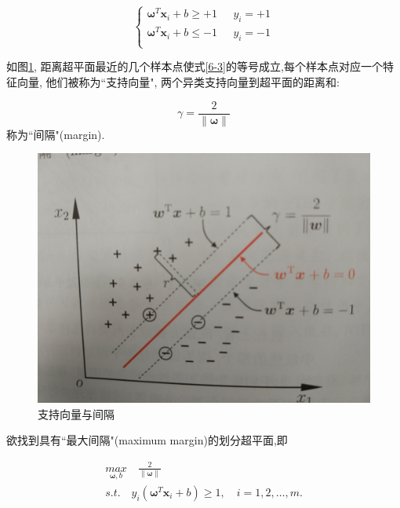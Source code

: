 \documentclass[12pt]{article}
\numberwithin{equation}{section}%
\begin{document}
\begin{equation}
\label{6-3}
 \left\{ \begin{array}{ll}
 \boldsymbol{\omega}^{T}\boldsymbol{x}_{i}+b \geqslant +1 & \textrm{ $y_{i}=+1$}\\
\boldsymbol{\omega}^{T}\boldsymbol{x}_{i}+b \leqslant -1  &  \textrm{ $y_{i}=-1$}\\
\end{array} \right.
\end{equation}

如图\ref{6-2}, 距离超平面最近的几个样本点使式\ref{6-3}的等号成立,每个样本点对应一个特征向量, 他们被称为``支持向量", 两个异类支持向量到超平面的距离和:

\begin{equation}
\gamma=\frac{2}{\parallel \boldsymbol{\omega} \parallel}
\end{equation}
称为``间隔"(margin).
\begin{figure}
\centering\includegraphics[width=5in]{6-2.jpg}
\caption{支持向量与间隔}
\label{6-2}
\end{figure}

欲找到具有``最大间隔"(maximum margin)的划分超平面,即



\begin{equation}
\begin{split}        %
 {\underset{\boldsymbol{\omega},b}{max}} \quad \frac{2}{\parallel \boldsymbol{\omega} \parallel}  \\
 s.t. \quad y_{i}(\boldsymbol{\omega}^{T}\boldsymbol{x}_{i}+b) \geqslant 1, \quad i= 1,2, \ldots ,m.
\end{split}
\label{6-5}
\end{equation}
\end{document}
